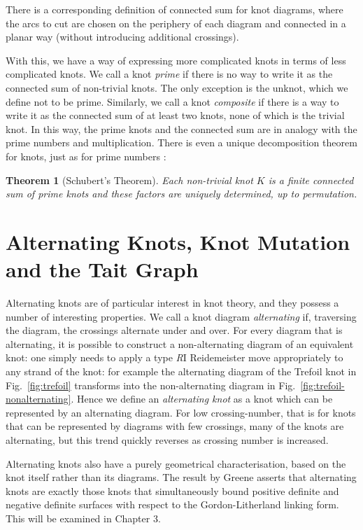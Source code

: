 \documentclass[12pt]{report}
\newtheorem*{theorem}{Theorem}
\theoremstyle{upright}
\begin{document}
There is a corresponding definition of connected sum for knot diagrams, where the arcs to cut are chosen on the periphery of each diagram and connected in a planar way (without introducing additional crossings).

With this, we have a way of expressing more complicated knots in terms of less complicated knots. We call a knot \textit{prime} if there is no way to write it as the connected sum of non-trivial knots. The only exception is the unknot, which we define not to be prime.  Similarly, we call a knot \textit{composite} if there is a way to write it as the connected sum of at least two knots, none of which is the trivial knot. In this way, the prime knots and the connected sum are in analogy with the prime numbers and multiplication. There is even a unique decomposition theorem for knots, just as for prime numbers \cite[Thoerem 7.12]{knots}:

\begin{theorem}[Schubert's Theorem]
	Each non-trivial knot $K$ is a finite connected sum of prime knots and these factors are uniquely determined, up to permutation. 
\end{theorem}

\section{Alternating Knots, Knot Mutation and the Tait Graph}
Alternating knots are of particular interest in knot theory, and they possess a number of interesting properties. We call a knot diagram \textit{alternating} if, traversing the diagram, the crossings alternate under and over. For every diagram that is alternating, it is possible to construct a non-alternating diagram of an equivalent knot: one simply needs to apply a type \textit{R}I Reidemeister move appropriately to any strand of the knot: for example the alternating diagram of the Trefoil knot in Fig.~\ref{fig:trefoil} transforms into the non-alternating diagram in Fig.~\ref{fig:trefoil-nonalternating}. Hence we define an \textit{alternating knot} as a knot which can be represented by an alternating diagram. For low crossing-number, that is for knots that can be represented by diagrams with few crossings, many of the knots are alternating, but this trend quickly reverses as crossing number is increased.

Alternating knots also have a purely geometrical characterisation, based on the knot itself rather than its diagrams. The result by Greene \cite{alternating-links-definite-surfaces} asserts that alternating knots are exactly those knots that simultaneously bound positive definite and negative definite surfaces with respect to the Gordon-Litherland linking form. This will be examined in Chapter 3.
\end{document}
